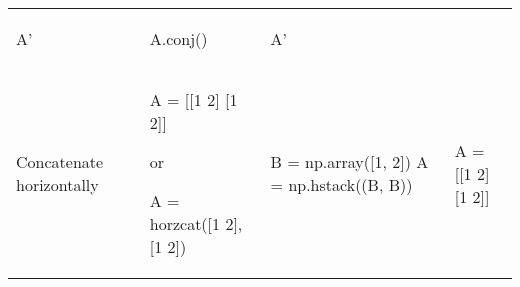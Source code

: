 \documentclass[10pt, landscape]{article}
\newenvironment{Shaded}{}{}
\newcommand{\DecValTok}[1]{\textcolor[rgb]{0.25,0.63,0.44}{{#1}}}
\newcommand{\FloatTok}[1]{\textcolor[rgb]{0.25,0.63,0.44}{{#1}}}
\newcommand{\OperatorTok}[1]{\textcolor[rgb]{0.40,0.40,0.40}{{#1}}}
\newcommand{\NormalTok}[1]{{#1}}
\begin{document}
\begin{multicols*}{2}
\begin{table}[ht]
\begin{tabular}[ ]{@{}llll@{}}
\begin{minipage}[t]{0.23\columnwidth}
\begin{Shaded}
\begin{Highlighting}[]
\NormalTok{A'}
\end{Highlighting}
\end{Shaded}
\strut
\end{minipage} & \begin{minipage}[t]{0.20\columnwidth}\raggedright\strut
\begin{Shaded}
\begin{Highlighting}[]
\NormalTok{A.conj()}
\end{Highlighting}
\end{Shaded}
\strut
\end{minipage} & \begin{minipage}[t]{0.20\columnwidth}\raggedright\strut
\begin{Shaded}
\begin{Highlighting}[]
\NormalTok{A'}
\end{Highlighting}
\end{Shaded}
\strut
\end{minipage}\tabularnewline
\begin{minipage}[t]{0.24\columnwidth}\raggedright\strut
Concatenate horizontally\strut
\end{minipage} & \begin{minipage}[t]{0.23\columnwidth}\raggedright\strut
\begin{Shaded}
\begin{Highlighting}[]
\NormalTok{A = [[}\FloatTok{1} \FloatTok{2}\NormalTok{] [}\FloatTok{1} \FloatTok{2}\NormalTok{]]}
\end{Highlighting}
\end{Shaded}

or

\begin{Shaded}
\begin{Highlighting}[]
\NormalTok{A = horzcat([}\FloatTok{1} \FloatTok{2}\NormalTok{], [}\FloatTok{1} \FloatTok{2}\NormalTok{])}
\end{Highlighting}
\end{Shaded}
\strut
\end{minipage} & \begin{minipage}[t]{0.20\columnwidth}\raggedright\strut
\begin{Shaded}
\begin{Highlighting}[]
\NormalTok{B }\OperatorTok{=} \NormalTok{np.array([}\DecValTok{1}\NormalTok{, }\DecValTok{2}\NormalTok{])}
\NormalTok{A }\OperatorTok{=} \NormalTok{np.hstack((B, B))}
\end{Highlighting}
\end{Shaded}
\strut
\end{minipage} & \begin{minipage}[t]{0.20\columnwidth}\raggedright\strut
\begin{Shaded}
\begin{Highlighting}[]
\NormalTok{A = [[}\FloatTok{1} \FloatTok{2}\NormalTok{] [}\FloatTok{1} \FloatTok{2}\NormalTok{]]}
\end{Highlighting}
\end{Shaded}


\end{minipage}
\end{tabular}
\end{table}
\end{multicols*}
\end{document}
